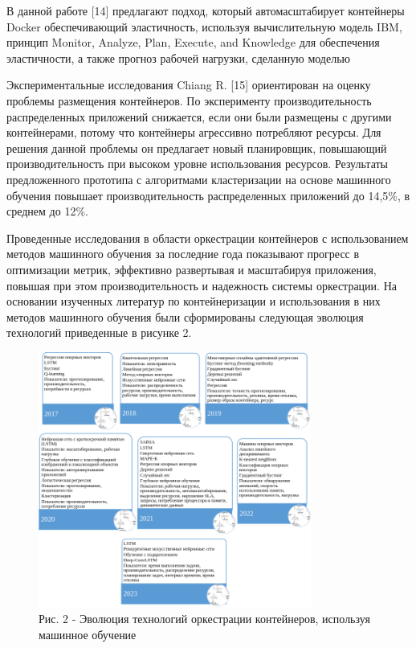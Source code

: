 \begin{multicols}{2}
В данной работе {[}14{]} предлагают подход, который автомасштабирует
контейнеры Docker обеспечивающий эластичность, используя вычислительную
модель IBM, принцип Monitor, Analyze, Plan, Execute, and Knowledge для
обеспечения эластичности, а также прогноз рабочей нагрузки, сделанную
моделью

Экспериментальные исследования Chiang R. {[}15{]} ориентирован на оценку
проблемы размещения контейнеров. По эксперименту производительность
распределенных приложений снижается, если они были размещены с другими
контейнерами, потому что контейнеры агрессивно потребляют ресурсы. Для
решения данной проблемы он предлагает новый планировщик, повышающий
производительность при высоком уровне использования ресурсов. Результаты
предложенного прототипа с алгоритмами кластеризации на основе машинного
обучения повышает производительность распределенных приложений до
14,5\%, в среднем до 12\%.

Проведенные исследования в области оркестрации контейнеров с
использованием методов машинного обучения за последние года показывают
прогресс в оптимизации метрик, эффективно развертывая и масштабируя
приложения, повышая при этом производительность и надежность системы
оркестрации. На основании изученных литератур по контейнеризации и
использования в них методов машинного обучения были сформированы
следующая эволюция технологий приведенные в рисунке 2.
\end{multicols}

\begin{figure}[H]
	\centering
	\includegraphics[width=0.8\textwidth]{assets/1001}
	\caption*{Рис. 2 - Эволюция технологий оркестрации контейнеров, используя машинное обучение}
\end{figure}

